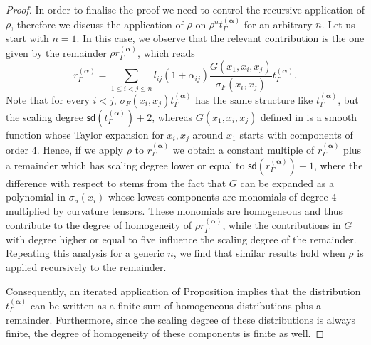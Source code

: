 \documentclass[10pt]{book}
\newcommand{\sd}{\mathsf{sd}}
\theoremstyle{break}
\newtheorem{proof}{Proof}
\begin{document}
\begin{proof}
In order to finalise the proof we need to control the recursive application of $\rho$, therefore we discuss the application of $\rho$ on $\rho^nt_\Gamma^{(\boldsymbol{\alpha})}$ for an arbitrary $n$. 
Let us start with $n=1$. In this case, we observe that the relevant contribution is the one given by the remainder $\rho r^{(\boldsymbol{\alpha})}_\Gamma$, which reads 
\[
r^{(\boldsymbol{\alpha})}_\Gamma = \sum_{1\leq i < j \leq n} l_{ij}(1+ \alpha_{ij}) \frac{G(x_1,x_i,x_j)}{\sigma_F(x_i,x_j)}t_\Gamma^{(\boldsymbol{\alpha})}.
\]
Note that for every $i<j$, $\sigma_F(x_i,x_j)t_\Gamma^{(\boldsymbol{\alpha})}$ has the same structure like $t_\Gamma^{(\boldsymbol{\alpha})}$, but the scaling degree $\sd(t_\Gamma^{(\boldsymbol{\alpha})}) +2$, whereas $G(x_1,x_i,x_j)$ defined in %
is a smooth function whose Taylor expansion for $x_i, x_j$ around $x_1$ starts with components of order $4$. Hence, if we apply $\rho$ to $r^{(\boldsymbol{\alpha})}_\Gamma$ we obtain
a constant multiple of $r^{(\boldsymbol{\alpha})}_\Gamma$ plus a remainder which has scaling degree lower or equal to $\sd(r^{(\boldsymbol{\alpha})}_\Gamma)-1$, where the difference with respect to %
stems from the fact that $G$ can be expanded as a polynomial in $\sigma_a(x_i)$ whose lowest components are monomials of degree $4$ multiplied by curvature tensors. These monomials are homogeneous and thus contribute to the degree of homogeneity of $\rho r^{(\boldsymbol{\alpha})}_\Gamma$, while the contributions in $G$ with degree higher or equal to five influence the scaling degree of the remainder.
Repeating this analysis for a generic $n$, we find that similar results hold when $\rho$ is applied recursively to the remainder.

Consequently, an iterated application of Proposition %
implies that the distribution $t_\Gamma^{(\boldsymbol{\alpha})}$ can be written as a finite sum of homogeneous distributions plus a remainder. Furthermore, since the scaling degree of these distributions is always finite, the degree of homogeneity of these components is finite as well. 
\end{proof}
\end{document}
